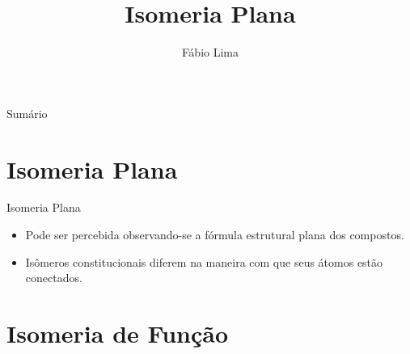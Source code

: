 \documentclass[presentation,professionalfonts,aspectratio=169]{beamer}
\date{}
\author{Fábio Lima}
\date{}
\title{ Isomeria Plana}
\begin{document}
\begingroup
  \maketitle
  \endgroup
\begin{frame}{Sumário}
\tableofcontents
\end{frame}


\section{Isomeria Plana}
\label{sec:orgf9b3366}


\begin{frame}[label={sec:org61425b8}]{Isomeria Plana}
\begin{itemize}
\item Pode ser percebida observando-se a  fórmula estrutural plana dos compostos.
\item \alert{Isômeros constitucionais} diferem na  maneira com que seus átomos estão  conectados.
\end{itemize}
\end{frame}


\section{Isomeria de Função}
\label{sec:org465cb39}
\end{document}
